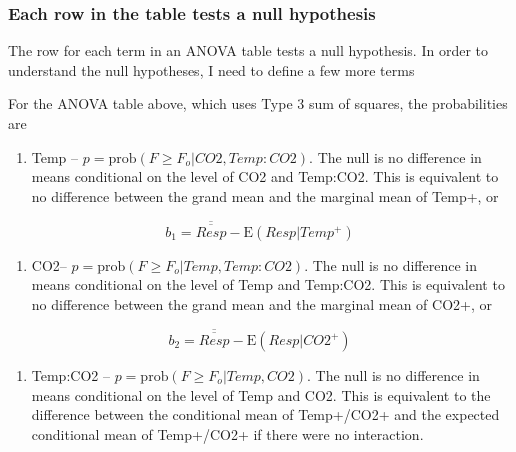 \documentclass[]{book}
\providecommand{\tightlist}{%
  \setlength{\itemsep}{0pt}\setlength{\parskip}{0pt}}
\begin{document}
\subsubsection{Each row in the table tests a null
hypothesis}\label{each-row-in-the-table-tests-a-null-hypothesis}

The row for each term in an ANOVA table tests a null hypothesis. In
order to understand the null hypotheses, I need to define a few more
terms

For the ANOVA table above, which uses Type 3 sum of squares, the
probabilities are

\begin{enumerate}
\def\labelenumi{\arabic{enumi}.}
\tightlist
\item
  Temp -- \(p = \mathrm{prob}(F \ge F_o|CO2, Temp:CO2)\). The null is no
  difference in means conditional on the level of CO2 and Temp:CO2. This
  is equivalent to no difference between the grand mean and the marginal
  mean of Temp+, or
\end{enumerate}

\begin{equation}
b_1 = \overline{\overline{Resp}} - \mathrm{E}(Resp|Temp^+)
\end{equation}

\begin{enumerate}
\def\labelenumi{\arabic{enumi}.}
\setcounter{enumi}{1}
\tightlist
\item
  CO2-- \(p = \mathrm{prob}(F \ge F_o|Temp, Temp:CO2)\). The null is no
  difference in means conditional on the level of Temp and Temp:CO2.
  This is equivalent to no difference between the grand mean and the
  marginal mean of CO2+, or
\end{enumerate}

\begin{equation}
b_2 = \overline{\overline{Resp}} - \mathrm{E}(Resp|CO2^+)
\end{equation}

\begin{enumerate}
\def\labelenumi{\arabic{enumi}.}
\setcounter{enumi}{2}
\tightlist
\item
  Temp:CO2 -- \(p = \mathrm{prob}(F \ge F_o|Temp, CO2)\). The null is no
  difference in means conditional on the level of Temp and CO2. This is
  equivalent to the difference between the conditional mean of
  Temp+/CO2+ and the expected conditional mean of Temp+/CO2+ if there
  were no interaction.
\end{enumerate}
\end{document}
